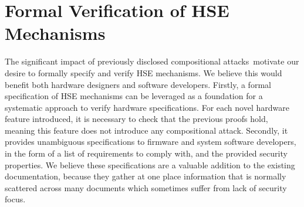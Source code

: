 \section{Formal Verification of HSE Mechanisms}
\label{sec:intro:verif}

The significant impact of previously disclosed compositional
attacks\,\cite{duflot2009smram,wojtczuk2009smram,domas2015sinkhole,kallenberg2015racecondition,kovah2015senter}
motivate our desire to formally specify and verify HSE mechanisms.
%
We believe this would benefit both hardware designers and software developers.
%
Firstly, a formal specification of HSE mechanisms can be leveraged as a
foundation for a systematic approach to verify hardware specifications.
%
For each novel hardware feature introduced, it is necessary to check that the
previous proofs hold, meaning this feature does not introduce any compositional
attack.
%
Secondly, it provides unambiguous specifications to firmware and system software
developers, in the form of a list of requirements to comply with, and the
provided security properties.
%
We believe these specifications are a valuable addition to the existing
documentation, because they gather at one place information that is normally
scattered across many documents which sometimes suffer from lack of security
focus.
%
%

